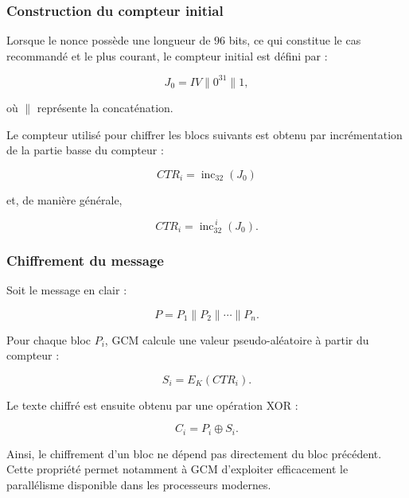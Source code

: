 \documentclass[12pt,a4paper]{article}
\begin{document}
\subsubsection{Construction du compteur initial}

Lorsque le nonce possède une longueur de $96$ bits, ce qui constitue
le cas recommandé et le plus courant, le compteur initial est défini
par :

\begin{equation}
J_0 = IV \parallel 0^{31} \parallel 1,
\label{eq:gcm_j0}
\end{equation}

où $\parallel$ représente la concaténation.

Le compteur utilisé pour chiffrer les blocs suivants est obtenu par
incrémentation de la partie basse du compteur :

\begin{equation}
CTR_i = \operatorname{inc}_{32}(J_0)
\end{equation}

et, de manière générale,

\begin{equation}
CTR_i = \operatorname{inc}_{32}^{\,i}(J_0).
\end{equation}

\subsubsection{Chiffrement du message}

Soit le message en clair :

\begin{equation}
P = P_1 \parallel P_2 \parallel \cdots \parallel P_n.
\end{equation}

Pour chaque bloc $P_i$, GCM calcule une valeur pseudo-aléatoire à
partir du compteur :

\begin{equation}
S_i = E_K(CTR_i).
\end{equation}

Le texte chiffré est ensuite obtenu par une opération XOR :

\begin{equation}
C_i = P_i \oplus S_i.
\label{eq:gcm_ciphertext}
\end{equation}

Ainsi, le chiffrement d'un bloc ne dépend pas directement du bloc
précédent. Cette propriété permet notamment à GCM d'exploiter
efficacement le parallélisme disponible dans les processeurs modernes.
\end{document}
